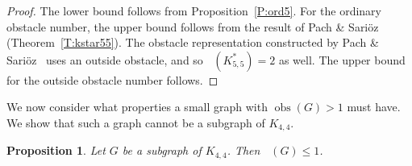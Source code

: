 \documentclass[12pt]{amsart}
\newtheorem{proposition}[theorem]{Proposition}
\theoremstyle{remark}
\DeclareMathOperator{\obs}{\ensuremath{\mathrm{obs}}}
\DeclareMathOperator{\obsout}{\ensuremath{\obs_\mathrm{out}}}
\begin{document}
\begin{proof}
The lower bound follows from Proposition~\ref{P:ord5}.
For the ordinary obstacle number,
the upper bound follows from the result of
Pach \& Sari\"{o}z (Theorem~\ref{T:kstar55}).
The obstacle representation constructed by
Pach \& Sari\"{o}z~\cite[Fig.~1]{PacSar11}
uses an outside obstacle,
and so $\obsout(K^*_{5,5}) = 2$ as well.
The upper bound for the outside obstacle number follows.\end{proof}

We now consider what properties a small graph with $\obs(G) > 1$
must have.
We show that such a graph cannot be a subgraph of $K_{4,4}$.

\begin{proposition}\label{P:subgK44}
Let $G$ be a subgraph of $K_{4,4}$.
Then $\obsout(G)\le 1$.
\end{proposition}
\end{document}
